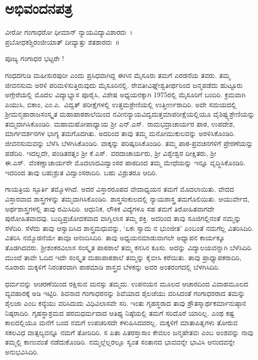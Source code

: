 {\fontsize{14}{16}\selectfont
\chapter{ಅಭಿವಂದನಪತ್ರ}

\begin{center}
ವೀರೋ ಗಂಗಾಧರೋ ಧೀಮಾನ್ ನ್ಯಾಯವಿದ್ಯಾವಿಶಾರದಃ~।\\
ಪ್ರಬೋಧಕಶ್ಚಿರಂಜೀಯಾತ್ ದೀವ್ಯಾತ್ತು ಶತಶಾರದಃ~॥
\end{center}

ಪೂಜ್ಯ ಗಂಗಾಧರ ಭಟ್ಟರೇ !

ಗಂಧದಗುಡಿ ಮಹೀಸುರಪುರೀ ಎಂದು ಪ್ರಸಿಧವಾಗಿದ್ದ ಈಗಿನ ಮೈಸೂರು \-ತಮಗೆ ಎರಡನೆಯ ತವರು. ತಮ್ಮ ಜೀವನಸುಮ ಅರಳಿ ಪರಿಮಳಿಸುತ್ತಿರುವುದು ಮೈಸೂರಿ\-ನಲ್ಲಿ. ರೇವತೀವಿಘ್ನೇಶ್ವತೀರ್ಥರಿಂದ ಜನ್ಮಪಡೆದು ಹುಟ್ಟೂರು ಅಗ್ಗೇರೆಯಲ್ಲಿ ಮೊದಲ ವಿದ್ಯಾಭ್ಯಾಸ ಪೂರೈಸಿ, ವಿಶೇಷ ಅಧ್ಯಯನಕ್ಕಾಗಿ 1975ರಲ್ಲಿ ಮೈಸೂರಿಗೆ ಬಂದಿರಿ. ಕ್ರಮವಾಗಿ ಪಿಯುಸಿ, ಬಿಕಾಂ, ಎಂ.ಎ.\ ವಿದ್ವತ್ ಪರೀಕ್ಷೆಗಳಲ್ಲಿ ಉತ್ತಮಶ್ರೇಣಿಯಲ್ಲಿ ಉತ್ತೀರ್ಣರಾದಿರಿ. ಅದೇ ಸಮಯದಲ್ಲಿ ಶ್ರೀಮನ್ಮಹಾರಾಜಸಂಸ್ಕೃತ ಮಹಾಪಾಠಶಾಲೆಯಿಂದ ನವೀನನ್ಯಾಯವಿದ್ವದುತ್ತಮಾಪರೀಕ್ಷೆಯಲ್ಲಿಯೂ ವೈಶಿಷ್ಟ್ಯಶ್ರೇಣಿಯನ್ನು ತಮ್ಮದಾಗಿಸಿಕೊಂಡಿರಿ. ಮಹಾಮಹೋಪಾಧ್ಯಾಯ ಶ್ರೀ ಎನ್.ಎಸ್.\ ರಾಮಭದ್ರಾಚಾರ್ಯರ ಪಾಠ, ಉಪದೇಶ, ಮಾರ್ಗದರ್ಶನಗಳ ಭಾಗ್ಯ ತಮಗೊದಗಿತು. ಅದರಿಂದ ತಾವು ತಮ್ಮ ಮನೋಮುಕುಲವನ್ನು ಅರಳಿಸಿಕೊಂಡಿರಿ. ಜೀವನಸುಮವನ್ನು ಬೆಳೆಸಿ ಬೆಳಗಿಸಿಕೊಂಡಿರಿ. ವಾಕ್ಕನ್ನು ಪರಿಷ್ಕರಿಸಿಕೊಂಡಿರಿ. ತಮ್ಮ ಪಾಠ-ಪ್ರವಚನಗಳಿಗೆ ಪ್ರೇರಣೆಯನ್ನು ಪಡೆದಿರಿ. ಇದಲ್ಲದೇ, ಪಂಡಿತರತ್ನಂ ಶ್ರೀ ಕೆ.ಎಸ್.\ ವರದಾಚಾರ್ಯರು, ಶ್ರೀ ವಿಶ್ವೇಶ್ವರ ದೀಕ್ಷಿತರು, ಶ್ರೀ ಈ.ಎಸ್.\ ವೆಂಕಣ್ಣಾಚಾರ್ಯರೇ ಮೊದಲಾದವಿದ್ವಾಂಸರ ಪಾಠದಿಂದ ತಮ್ಮ ಮೇಧೆಯನ್ನು ಇನ್ನೂ ವೃದ್ಧಿಸಿಕೊಂಡಿರಿ. ಇದರಿಂದ ತಾವು ಬಹುಶ್ರುತ ವಿದ್ವಾಂಸರಾದಿರಿ. ಬಹು ವಿಶ್ರುತರೂ ಆದಿರಿ.

ಗಾಯತ್ರಿಯ ಸ್ಫೂರ್ತಿ ತಮ್ಮೊಳಗಿದೆ. ಅದರ ವಿಸ್ತಾರರೂಪದ ವೇದಾಧ್ಯಯನ ತಮಗೆ ಮೊದಲಾಯಿತು. ವೇದದ ವಿಸ್ತಾರವಾದ ಶಾಸ್ತ್ರಗಳನ್ನು ತಮ್ಮದಾಗಿಸಿಕೊಂಡಿರಿ. ಶಾಸ್ತ್ರಸಂಕುಲದಲ್ಲಿ ನ್ಯಾಯಶಾಸ್ತ್ರ ತಮಗೊಲಿಯಿತು. ಆಯುರ್ವೇದ, ಅರ್ಥಶಾಸ್ತ್ರಗಳಲ್ಲಿ ತಾವು ರಮಿಸಿದಿರಿ. ಆಧುನಿಕ, ಲೌಕಿಕ ವಿದ್ಯೆ\-ಗಳೂ ಸಹ ತಮಗೆ ತಿರೋಹಿತವಾಗದೇ ಪುರೋಹಿತವಾದವು. ಬುದ್ಧಿಪ್ರಚೋದಕವಾದ ವಾಗ್ವಿಲಾಸ ತಮ್ಮ ಶಕ್ತಿ. ಅದರಿಂದ ತಾವು ಸೂಜಿಗಲ್ಲಿನಂತೆ ನಮ್ಮನ್ನು ಸೆಳೆದಿರಿ. ಸೆಳೆದು ತಾವು ಆಸ್ವಾದಿಸಿದ ಶಾಸ್ತ್ರಮಧುವನ್ನು,  `ಏಕಃ ಸ್ವಾದು ನ ಭುಂಜೀತ’ ಎಂಬಂತೆ ನಮಗೆಲ್ಲ ವಿತರಿಸಿದಿರಿ. ವಿತರಿಸಿ ನಮ್ಮೊಡನೆಯೇ ತಾವೂ ಆನಂದಿಸಿದಿರಿ. ತಾವು ಅಧ್ಯಯನಮಾಡುವಾಗಲೇ ಅಧ್ಯಾಪನ ಕಾರ್ಯಕ್ಕೂ ತೊಡಗಿದವರು. ಶ್ರೀಶಂಕರವಿಲಾಸ ಸಂಸ್ಕೃತ ಪಾಠಶಾಲೆ ತಮ್ಮ ಕನಸಿನ ಕೂಸು. ಅದನ್ನು ವಿದ್ಯಾಲಯವನ್ನಾಗಿ ಬೆಳೆಸಿದಿರಿ. ಮುಂದೆ ತಾವೇ ಓದಿದ ಇದೇ ಸಂಸ್ಕೃತ ಮಹಾಪಾಠಶಾಲೆ ತಮ್ಮನ್ನು ಕೈಬೀಸಿ ಕರೆಯಿತು. ತಾವು ಪ್ರಾಧ್ಯಾಪಕರಾದಿರಿ, ನೂರಾರು ಮಕ್ಕಳಿಗೆ ನಿರಂತರವಾಗಿ ಪಾಠಮಾಡಿ ಶಾಸ್ತ್ರದ ಬೆಳಕನ್ನು ಅವರ ಅಂತರಂಗದಲ್ಲಿ ಬೆಳಗಿಸಿದಿರಿ. 

ಧರ್ಮವನ್ನು ಆಚರಣೆಯಿಂದ ರಕ್ಷಿಸುವ ಮನಸ್ಸು ತಮ್ಮದು. ಉಪನಯನ ಮೂಲದ ಆಚಾರದಿಂದ ವಿವಾಹಮೂಲದ ವ್ಯವಹಾರಕ್ಕೆ ಅಡಿ ಇಟ್ಟಿರಿ. ಶಿವನಾದ ಗಂಗಾಧರನನ್ನು ಶಿವೆಯಾದ ಶೈಲಜೆಯು ವರಿಸಿದಂತೆ ಗಂಗಾಧರರಾದ ತಮನ್ನು ಶೈಲಜಾ ಎಂಬ ಕನ್ಯೆಯು ವರಿಸಿದುದು ವಿಧಿವಿಲಾಸವೇ ಸರಿ. ಇಂತು ಗೃಹಸ್ಥರಾದ ತಾವು ಶ್ರೌತಸ್ಮಾರ್ಥಕರ್ಮಾನುಷ್ಠಾನ ನಿಷ್ಠರಾದಿರಿ. ಗೃಹಸ್ಥಾಶ್ರಮದ ಪರಮಧರ್ಮವಾದ ಆತಿಥ್ಯ ನಿಷ್ಠೆಯಲ್ಲಿ ತಮಗೆ ಸರಿದೊರೆ ಯಾರಿಲ್ಲ. ಎಂಥ ಕಷ್ಟ ಕಾಲದಲ್ಲಿಯೂ ಮನೆಗೆ ಬಂದ ನಮಗೆ ಉಪಚರಿಸದೇ ಕಳುಹಿಸಿದವರಲ್ಲ. ಮಕ್ಕಳಿಗೆ ಮಾತಾಪಿತೃಗಳು ತೋರುವ ಸಕಲವಿಧ ವಾತ್ಸಲ್ಯವನ್ನೂ ನಮಗೆ ತೋರಿದಿರಿ. ಸ ಪಿತಾ ಪಿತರಸ್ತಾಸಾಂ ಕೇವಲಂ ಜನ್ಮಹೇತವಃ ಎಂಬ ಅಂಶವನ್ನು ನಾವು ತಮ್ಮಲ್ಲಿ ಕಾಣುವಂತೆ ನಡೆದುಕೊಂಡಿರಿ. ನಮ್ಮಲ್ಲೆಲ್ಲರಲ್ಲೂ ಸ್ವಂತ ಸಂತಾನದ ಭಾವವನ್ನೇ ಭಾವಿಸಿ ಆನಂದವನ್ನೇ ಅನುಭವಿಸಿದಿರಿ. 

}
